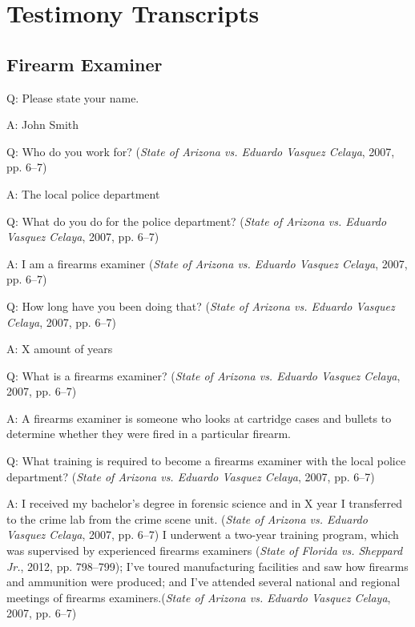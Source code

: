 \documentclass[print]{nuthesis}
\begin{document}
\appendix

\hypertarget{testimony-transcripts}{%
\chapter{Testimony Transcripts}\label{testimony-transcripts}}

\hypertarget{firearm-examiner}{%
\section{Firearm Examiner}\label{firearm-examiner}}

Q: Please state your name.

A: John Smith

Q: Who do you work for? (\emph{State of {Arizona} vs. Eduardo {Vasquez} {Celaya}}, 2007, pp. 6--7)

A: The local police department

Q: What do you do for the police department? (\emph{State of {Arizona} vs. Eduardo {Vasquez} {Celaya}}, 2007, pp. 6--7)

A: I am a firearms examiner (\emph{State of {Arizona} vs. Eduardo {Vasquez} {Celaya}}, 2007, pp. 6--7)

Q: How long have you been doing that? (\emph{State of {Arizona} vs. Eduardo {Vasquez} {Celaya}}, 2007, pp. 6--7)

A: X amount of years

Q: What is a firearms examiner? (\emph{State of {Arizona} vs. Eduardo {Vasquez} {Celaya}}, 2007, pp. 6--7)

A: A firearms examiner is someone who looks at cartridge cases and bullets to determine whether they were fired in a particular firearm.

Q: What training is required to become a firearms examiner with the local police department? (\emph{State of {Arizona} vs. Eduardo {Vasquez} {Celaya}}, 2007, pp. 6--7)

A: I received my bachelor's degree in forensic science and in X year I transferred to the crime lab from the crime scene unit. (\emph{State of {Arizona} vs. Eduardo {Vasquez} {Celaya}}, 2007, pp. 6--7)
I underwent a two-year training program, which was supervised by experienced firearms examiners (\emph{State of {Florida} vs. Sheppard {Jr.}}, 2012, pp. 798--799);
I've toured manufacturing facilities and saw how firearms and ammunition were produced; and I've attended several national and regional meetings of firearms examiners.(\emph{State of {Arizona} vs. Eduardo {Vasquez} {Celaya}}, 2007, pp. 6--7)
\end{document}
